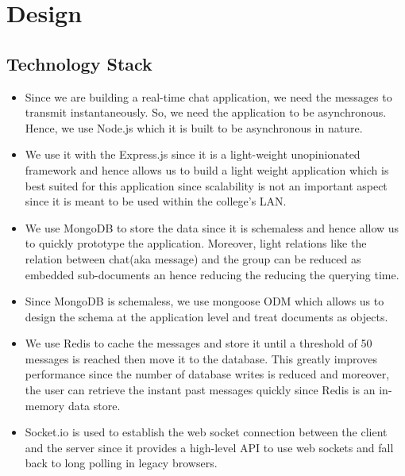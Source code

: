\documentclass{scrreprt}
\begin{document}
\chapter{Design}

\section{Technology Stack}
\begin{itemize}
  \item Since we are building a real-time chat application, we need the messages to
  transmit instantaneously. So, we need the application to be asynchronous.
  Hence, we use Node.js which it is built to be asynchronous in nature.

  \item We use it with the Express.js since it is a light-weight unopinionated
  framework and hence allows us to build a light weight application which is
  best suited for this application since scalability is not an important aspect
  since it is meant to be used within the college's LAN.

  \item We use MongoDB to store the data since it is schemaless and hence allow
  us to quickly prototype the application. Moreover, light relations like the
  relation between chat(aka message) and the group can be reduced as embedded
  sub-documents an hence reducing the reducing the querying time.

  \item Since MongoDB is schemaless, we use mongoose ODM which allows us to
  design the schema at the application level and treat documents as objects.

  \item We use Redis to cache the messages and store it until a threshold of 50
  messages is reached then move it to the database. This greatly improves
  performance since  the number of database writes is reduced and moreover, the
  user can retrieve the instant past messages quickly since Redis is an in-memory
  data store.

  \item Socket.io is used to establish the web socket connection between the
  client and the server since it provides a high-level API to use web sockets
  and fall back to long polling in legacy browsers.


\end{itemize}
\end{document}
